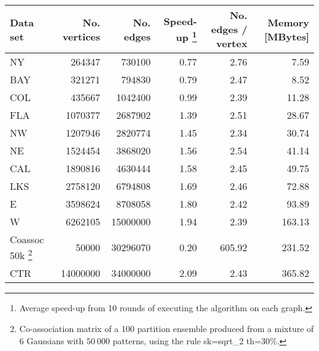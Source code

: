 \begin{minipage}[h]{\hsize}
	\centering
\begin{tabular}{lrrrrr}
\toprule
Data set &  No. vertices &   No. edges &     Speed-up \footnote{Average speed-up from 10 rounds of executing the algorithm on each graph.} &  No. edges / vertex & Memory [MBytes]\\
\midrule

NY                           &      264347 &    730100 &  0.77 &          2.76 &    7.59 \\
BAY                          &      321271 &    794830 &  0.79 &          2.47 &    8.52 \\
COL                          &      435667 &   1042400 &  0.99 &          2.39 &   11.28 \\
FLA                          &     1070377 &   2687902 &  1.39 &          2.51 &   28.67 \\
NW                           &     1207946 &   2820774 &  1.45 &          2.34 &   30.74 \\
NE                           &     1524454 &   3868020 &  1.56 &          2.54 &   41.14 \\
CAL                          &     1890816 &   4630444 &  1.58 &          2.45 &   49.75 \\
LKS                          &     2758120 &   6794808 &  1.69 &          2.46 &   72.88 \\
E                            &     3598624 &   8708058 &  1.80 &          2.42 &   93.89 \\
W                            &     6262105 &  15000000 &  1.94 &          2.39 &  163.13 \\
Coassoc 50k \footnote{Co-association matrix of a 100 partition ensemble produced from a mixture of 6 Gaussians with $50 \: 000$ patterns, using the rule sk=sqrt\_2 th=30\%.} 							   &       50000 &  30296070 &  0.20 &        605.92 &  231.52 \\
CTR                          &    14000000 &  34000000 &  2.09 &          2.43 &  365.82 \\

\bottomrule
\end{tabular}
\label{tab:mst speedup}
\end{minipage}